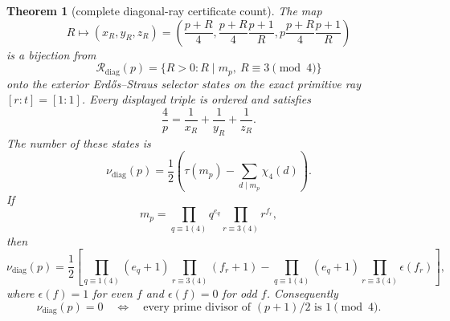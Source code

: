 \documentclass[11pt]{article}
\newtheorem{theorem}{Theorem}[section]
\theoremstyle{definition}
\theoremstyle{remark}
\newcommand{\1}{\mathbf 1}
\begin{document}
\begin{theorem}[complete diagonal-ray certificate count]
\label{thm:diag-count}
The map
\begin{equation}\label{eq:diag-R-map}
 R\longmapsto
 \left(
  x_R,y_R,z_R
 \right)
 =\left(
  \frac{p+R}{4},
  \frac{p+R}{4}\frac{p+1}{R},
  p\frac{p+R}{4}\frac{p+1}{R}
 \right)
\end{equation}
is a bijection from
\begin{equation}\label{eq:diag-R-set}
 \mathscr R_{\mathrm{diag}}(p)
 =\{R>0:R\mid m_p,\ R\equiv3\pmod4\}
\end{equation}
onto the exterior Erdős--Straus selector states on the exact primitive ray
$[r:t]=[1:1]$.  Every displayed triple is ordered and satisfies
\begin{equation}\label{eq:diag-unit-fraction}
 \frac4p=\frac1{x_R}+\frac1{y_R}+\frac1{z_R}.
\end{equation}
The number of these states is
\begin{equation}\label{eq:diag-count-character}
 \boxed{
 \nu_{\mathrm{diag}}(p)
 =\frac12\left(
   \tau(m_p)-\sum_{d\mid m_p}\chi_4(d)
  \right).}
\end{equation}
If
\begin{equation}\label{eq:diag-factorization}
 m_p=
 \prod_{q\equiv1(4)}q^{e_q}
 \prod_{r\equiv3(4)}r^{f_r},
\end{equation}
then
\begin{equation}\label{eq:diag-count-factorized}
 \boxed{
 \nu_{\mathrm{diag}}(p)=\frac12\left[
 \prod_{q\equiv1(4)}(e_q+1)
 \prod_{r\equiv3(4)}(f_r+1)
 -
 \prod_{q\equiv1(4)}(e_q+1)
 \prod_{r\equiv3(4)}\epsilon(f_r)
 \right],}
\end{equation}
where $\epsilon(f)=1$ for even $f$ and $\epsilon(f)=0$ for odd $f$.
Consequently
\begin{equation}\label{eq:diag-exceptional-exact}
 \boxed{
 \nu_{\mathrm{diag}}(p)=0
 \quad\Longleftrightarrow\quad
 \text{every prime divisor of }(p+1)/2\text{ is }1\pmod4.}
\end{equation}
\end{theorem}
\end{document}
